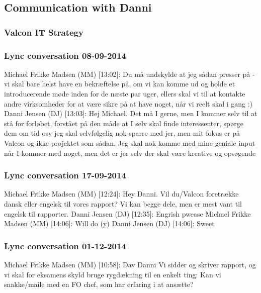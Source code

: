 \subsection{Communication with Danni}

\subsubsection{Valcon IT Strategy}

\subsubsection{Lync conversation 08-09-2014}
Michael Frikke Madsen (MM) [13:02]: 
Du må undskylde at jeg sådan presser på - vi skal bare helst have en bekræftelse på, om vi kan komme ud og holde et introducerende møde inden for de næste par uger, ellers skal vi til at kontakte andre virksomheder for at være sikre på at have noget, når vi reelt skal i gang :) \newline
Danni Jensen (DJ) [13:03]: 
Hej Michael. Det må I gerne, men I kommer selv til at stå for forløbet, forstået på den måde at I selv skal finde interessenter, spørge dem om tid osv
jeg skal selvfølgelig nok sparre med jer, men mit fokus er på Valcon og ikke projektet som sådan. Jeg skal nok komme med mine geniale input når I kommer med noget, men det er jer selv der skal være kreative og opsøgende

\subsubsection{Lync conversation 17-09-2014}
Michael Frikke Madsen (MM) [12:24]: 
Hey Danni. Vil du/Valcon foretrække dansk eller engelsk til vores rapport?
Vi kan begge dele, men er mest vant til engelsk til rapporter. \newline
Danni Jensen (DJ) [12:35]: 
Engrish pwease \newline
Michael Frikke Madsen (MM) [14:06]: 
Will do (y) \newline
Danni Jensen (DJ) [14:06]: 
Sweet

\subsubsection{Lync conversation 01-12-2014}
Michael Frikke Madsen (MM) [10:58]: 
Dav Danni
Vi sidder og skriver rapport, og vi skal for eksamens skyld bruge rygdækning til en enkelt ting:
Kan vi snakke/maile med en FO chef, som har erfaring i at ansætte?

